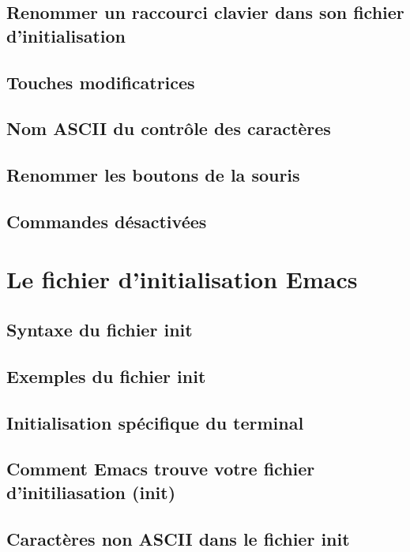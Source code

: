 \subsection{Renommer un raccourci clavier dans son fichier
  d'initialisation}\label{chap33sec3subsec6}
\subsection{Touches modificatrices}\label{chap33sec3subsec7}
\subsection{Nom ASCII du contrôle des caractères}\label{chap33sec3subsec8}
\subsection{Renommer les boutons de la souris}\label{chap33sec3subsec9}
\subsection{Commandes désactivées}\label{chap33sec3subsec10}
\section{Le fichier d'initialisation Emacs}\label{chap33sec4}
\subsection{Syntaxe du fichier init}\label{chap33sec4subsec1}
\subsection{Exemples du fichier init}\label{chap33sec4subsec2}
\subsection{Initialisation spécifique du terminal}\label{chap33sec4subsec3}
\subsection{Comment Emacs trouve votre fichier d'initiliasation
  (init)}\label{chap33sec4subsec4}
\subsection{Caractères non ASCII dans le fichier init}\label{chap33sec4subsec5}


